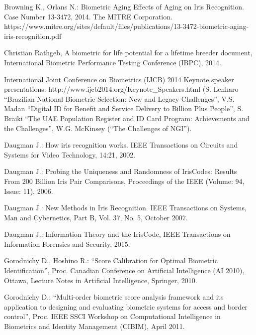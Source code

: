 \begin{thebibliography}{9}
		Browning K., Orlans N.: Biometric Aging Effects of Aging on Iris Recognition. Case Number 13-3472, 2014. The MITRE Corporation. 
https://www.mitre.org/sites/default/files/publications/13-3472-biometric-aging-iris-recognition.pdf


Christian Rathgeb, A biometric for life potential for a lifetime breeder document, International Biometric Performance
Testing Conference (IBPC), 2014. 


 International Joint Conference on Biometrics (IJCB) 2014 Keynote speaker presentations:  http://www.ijcb2014.org/Keynote\_Speakers.html 
(S. Lenharo ``Brazilian National Biometric Selection: New and Legacy Challenges'',  V.S. Madan ``Digital ID for Benefit and Service Delivery to Billion Plus People'', S. Braiki ``The UAE Population Register and ID Card Program: Achievements and the Challenges'',  W.G. McKinsey (``The Challenges of NGI''). 



	Daugman J.:  How iris recognition works. IEEE Transactions on Circuits and Systems for Video Technology, 14:21, 2002. 

	Daugman J.:  Probing the Uniqueness and Randomness of IrisCodes: Results From 200 Billion Iris Pair Comparisons, Proceedings of the IEEE   
(Volume: 94,  Issue: 11), 2006. 

	Daugman J.: New Methods in Iris Recognition. IEEE Transactions on Systems, Man and Cybernetics, Part B, Vol. 37, No. 5, October 2007.

		Daugman J.:  Information Theory and the IrisCode, IEEE Transactions on Information Forensics and Security, 2015. 





	Gorodnichy D., Hoshino R.: ``Score Calibration for Optimal Biometric Identification'', Proc. Canadian Conference on Artificial Intelligence (AI 2010), Ottawa, Lecture Notes in Artificial Intelligence, Springer, 2010.  

		Gorodnichy D.: ``Multi-order biometric score analysis framework and its application to designing and evaluating biometric systems for access and border control'', Proc. IEEE SSCI Workshop on Computational Intelligence in Biometrics and Identity Management (CIBIM), April 2011.


\end{thebibliography}

